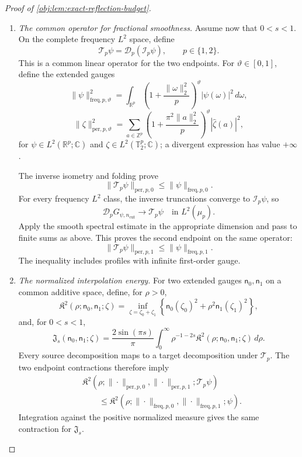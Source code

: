 \begin{proof}[Proof of \cref{obj:lem:exact-reflection-budget}]
\begin{enumerate}
\item \textit{The common operator for fractional smoothness.}
Assume now that \(0<s<1\). On the complete frequency \(L^2\) space, define
\[
\mathscr T_p\psi=\mathscr D_p(\mathcal I_p\psi),
\qquad p\in\{1,2\}.
\]
This is a common linear operator for the two endpoints. For \(\vartheta\in[0,1]\), define the extended gauges
\[
\|\psi\|_{\mathrm{freq},p,\vartheta}^2
=
\int_{\mathbb R^p}
\left(1+\frac{\|\omega\|_2^2}{p}\right)^\vartheta
|\psi(\omega)|^2\,d\omega,
\]
\[
\|\zeta\|_{\mathrm{per},p,\vartheta}^2
=
\sum_{a\in\mathbb Z^p}
\left(1+\frac{\pi^2\|a\|_2^2}{p}\right)^\vartheta
|\widehat\zeta(a)|^2,
\]
for \(\psi\in L^2(\mathbb R^p;\mathbb C)\) and
\(\zeta\in L^2(\mathbb T_2^p;\mathbb C)\); a divergent expression has value \(+\infty\).

The inverse isometry and folding prove
\[
\|\mathscr T_p\psi\|_{\mathrm{per},p,0}
\leq
\|\psi\|_{\mathrm{freq},p,0}.
\]
For every frequency \(L^2\) class, the inverse truncations converge to
\(\mathcal I_p\psi\), so
\[
\mathscr D_pG_{\psi,n_{\mathrm{cut}}}
\longrightarrow\mathscr T_p\psi
\quad\text{in }L^2(\mu_p).
\]
Apply the smooth spectral estimate in the appropriate dimension and pass to finite sums as above. This proves the second endpoint on the same operator:
\[
\|\mathscr T_p\psi\|_{\mathrm{per},p,1}
\leq
\|\psi\|_{\mathrm{freq},p,1}.
\]
The inequality includes profiles with infinite first-order gauge.

\item \textit{The normalized interpolation energy.}
For two extended gauges \(\mathsf n_0,\mathsf n_1\) on a common additive space, define, for \(\rho>0\),
\[
\mathfrak K^2(\rho;\mathsf n_0,\mathsf n_1;\zeta)
=
\inf_{\zeta=\zeta_0+\zeta_1}
\left\{
\mathsf n_0(\zeta_0)^2+
\rho^2\mathsf n_1(\zeta_1)^2
\right\},
\]
and, for \(0<s<1\),
\[
\mathfrak J_s(\mathsf n_0,\mathsf n_1;\zeta)
=
\frac{2\sin(\pi s)}{\pi}
\int_0^\infty
\rho^{-1-2s}
\mathfrak K^2(\rho;\mathsf n_0,\mathsf n_1;\zeta)\,d\rho.
\]
Every source decomposition maps to a target decomposition under \(\mathscr T_p\). The two endpoint contractions therefore imply
\[
\begin{aligned}
&\mathfrak K^2\!\left(
\rho;
\|\cdot\|_{\mathrm{per},p,0},
\|\cdot\|_{\mathrm{per},p,1};
\mathscr T_p\psi
\right)\\
&\qquad\leq
\mathfrak K^2\!\left(
\rho;
\|\cdot\|_{\mathrm{freq},p,0},
\|\cdot\|_{\mathrm{freq},p,1};
\psi
\right).
\end{aligned}
\]
Integration against the positive normalized measure gives the same contraction for \(\mathfrak J_s\).


\end{enumerate}
\end{proof}

